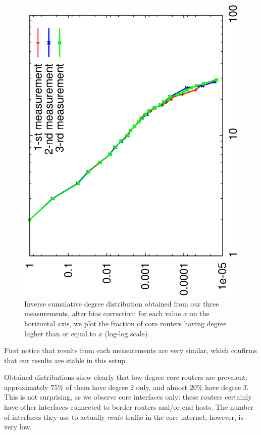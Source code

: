 \documentclass[conference]{IEEEtran}
\begin{document}
\begin{figure} \centering
\includegraphics[angle=-90,width=.9\columnwidth]{figures/final-result-icdf-loglog}
\caption{Inverse cumulative degree distribution obtained from our three measurements, after bias correction: for each value $x$ on the horizontal axis, we plot the fraction of core routers having degree higher than or equal to $x$ (log-log scale).}
\label{fig:distribs}
\end{figure}

First notice that results from each measurements are very similar, which confirms that our results are stable in this setup.

Obtained distributions show clearly that low-degree core routers are prevalent: approximately 75\% of them have degree 2 only, and almost 20\% have degree 3. This is not surprising, as we observe core interfaces only: these routers certainly have other interfaces connected to border routers and/or end-hosts. The number of interfaces they use to actually {\em route} traffic in the core internet, however, is very low.
\end{document}
